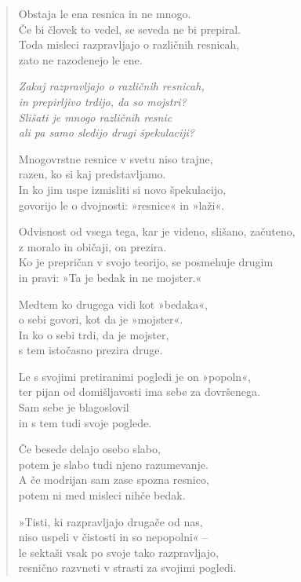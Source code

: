 \begin{verse}
Obstaja le ena resnica in ne mnogo.\\
Če bi človek to vedel, se seveda ne bi prepiral.\\
Toda misleci razpravljajo o različnih resnicah,\\
zato ne razodenejo le ene.

\emph{Zakaj razpravljajo o različnih resnicah,\\
in prepirljivo trdijo, da so mojstri?\\
Slišati je mnogo različnih resnic\\
ali pa samo sledijo drugi špekulaciji?}

Mnogovrstne resnice v svetu niso trajne,\\
razen, ko si kaj predstavljamo.\\
In ko jim uspe izmisliti si novo špekulacijo,\\
govorijo le o dvojnosti: »resnice« in »laži«.

Odvisnost od vsega tega, kar je videno, slišano, začuteno,\\
z moralo in običaji, on prezira.\\
Ko je prepričan v svojo teorijo, se posmehuje drugim\\
in pravi: »Ta je bedak in ne mojster.«

Medtem ko drugega vidi kot »bedaka«,\\
o sebi govori, kot da je »mojster«.\\
In ko o sebi trdi, da je mojster,\\
s tem istočasno prezira druge.

Le s svojimi pretiranimi pogledi je on »popoln«,\\
ter pijan od domišljavosti ima sebe za dovršenega.\\
Sam sebe je blagoslovil\\
in s tem tudi svoje poglede.

Če besede delajo osebo slabo,\\
potem je slabo tudi njeno razumevanje.\\
A če modrijan sam zase spozna resnico,\\
potem ni med misleci nihče bedak.

»Tisti, ki razpravljajo drugače od nas,\\
niso uspeli v čistosti in so nepopolni« --\\
le sektaši vsak po svoje tako razpravljajo,\\
resnično razvneti v strasti za svojimi pogledi.


\end{verse}

